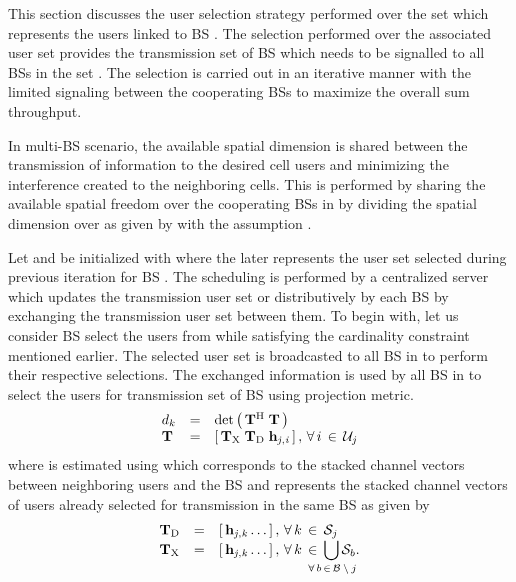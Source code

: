 
This section discusses the user selection strategy performed over the set  which represents the users linked to BS . The selection performed over the associated user set  provides the transmission set  of BS  which needs to be signalled to all BSs in the set . The selection is carried out in an iterative manner with the limited signaling between the cooperating BSs to maximize the overall sum throughput.

In multi-BS scenario, the available spatial dimension  is shared between the transmission of information to the desired cell users and minimizing the interference created to the neighboring cells. This is performed by sharing the available spatial freedom  over the cooperating BSs in  by dividing the spatial dimension over  as given by  with the assumption .

Let  and  be initialized with  where the later represents the user set selected during previous iteration for BS . The scheduling is performed by a centralized server which updates the transmission user set or distributively by each BS by exchanging the transmission user set  between them. To begin with, let us consider BS  select the users from  while satisfying the cardinality constraint mentioned earlier. The selected user set  is broadcasted to all BS in  to perform their respective selections. The exchanged information  is used by all BS in  to select the users for transmission set  of BS  using projection metric.
\begin{equation}
\begin{array}{lcl}
d_k &=& \det \left ( \, \mathbf{T}^{\mathrm{H}} \; \mathbf{T} \, \right ) \\
\mathbf{T} &=& \left [ \, \mathbf{T}_{\mathrm{X}} \; \mathbf{T}_{\mathrm{D}} \; \mathbf{h}_{\mathit{j},\mathit{i}} \, \right ], \, \forall \, i \, \in \, \mathcal{U}_j
\end{array}
\label{sus-e1}
\end{equation}
where  is estimated using  which corresponds to the stacked channel vectors between neighboring users and the BS  and  represents the stacked channel vectors of users already selected for transmission in the same BS  as given by
\begin{equation}
\begin{array}{lcl}
\mbf{T}_{\mrm{D}} &=& \matscont{\mvecxyz{h}{j}{k} \dotso}, \fall k \inm \mc{S}_j \\
\mbf{T}_{\mrm{X}} &=& \matscont{\mvecxyz{h}{j}{k} \dotso }, \fall k \inm \displaystyle \bigcup_{\mathclap{\fall b \inm \mc{B} \bs j}} \mc{S}_b.
\end{array}
\label{sus-e2}
\end{equation}

